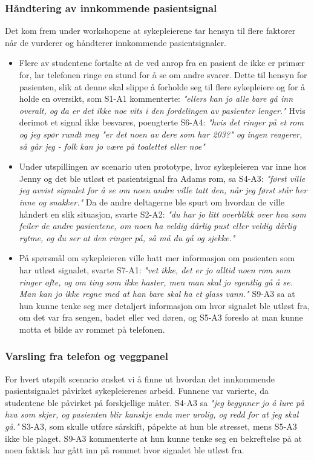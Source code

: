 \subsubsection{Håndtering av innkommende pasientsignal}
Det kom frem under workshopene at sykepleierene tar hensyn til flere faktorer når de vurderer og håndterer innkommende pasientsignaler. 
\begin{itemize}
\item Flere av studentene fortalte at de ved anrop fra en pasient de ikke er primær for, lar telefonen ringe en stund for å se om andre svarer. Dette til hensyn for pasienten, slik at denne skal slippe å forholde seg til flere sykepleiere og for å holde en oversikt, som S1-A1 kommenterte: \emph{"ellers kan jo alle bare gå inn overalt, og da er det ikke noe vits i den fordelingen av pasienter lenger."} Hvis derimot et signal ikke besvares, poengterte S6-A4: \emph{"hvis det ringer på et rom og jeg spør rundt meg "er det noen av dere som har 203?" og ingen reagerer, så går jeg - folk kan jo være på toalettet eller noe"}  
\item Under utspillingen av scenario uten prototype, hvor sykepleieren var inne hos Jenny og det ble utløst et pasientsignal fra Adams rom, sa S4-A3: \emph{"først ville jeg avvist signalet for å se om noen andre ville tatt den, når jeg først står her inne og snakker."} Da de andre deltagerne ble spurt om hvordan de ville håndert en slik situasjon, svarte S2-A2: \emph{"du har jo litt overblikk over hva som feiler de andre pasientene, om noen ha veldig dårlig pust eller veldig dårlig rytme, og du ser at den ringer på, så må du gå og sjekke."}  
\item På spørsmål om sykepleieren ville hatt mer informasjon om pasienten som har utløst signalet, svarte S7-A1: \emph{"vet ikke, det er jo alltid noen rom som ringer ofte, og om ting som ikke haster, men man skal jo egentlig gå å se. Man kan jo ikke regne med at han bare skal ha et glass vann."} S9-A3 sa at hun kunne tenke seg mer detaljert informasjon om hvor signalet ble utløst fra, om det var fra sengen, badet eller ved døren, og S5-A3 foreslo at man kunne motta et bilde av rommet på telefonen.
\end{itemize}

\subsubsection{Varsling fra telefon og veggpanel}
For hvert utspilt scenario ønsket vi å finne ut hvordan det innkommende pasientsignalet påvirket sykepleierenes arbeid. Funnene var varierte, da studentene ble påvirket på forskjellige måter. S4-A3 sa \emph{"jeg begynner jo å lure på hva som skjer, og pasienten blir kanskje enda mer urolig, og redd for at jeg skal gå."} S3-A3, som skulle utføre sårskift, påpekte at hun ble stresset, mens S5-A3 ikke ble plaget. S9-A3 kommenterte at hun kunne tenke seg en bekreftelse på at noen faktisk har gått inn på rommet hvor signalet ble utløst fra.

